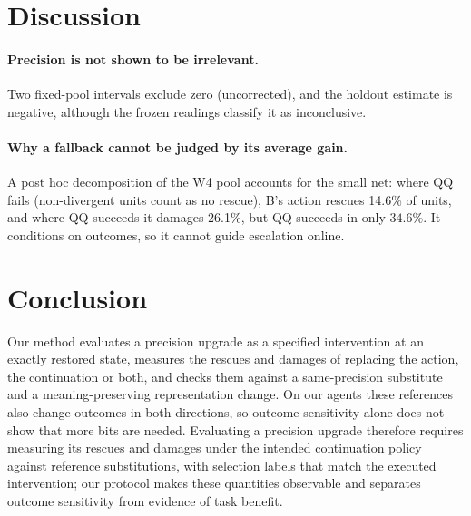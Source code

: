 \section{Discussion}
\label{sec:discussion}

\paragraph{Precision is not shown to be irrelevant.} Two fixed-pool intervals exclude zero (uncorrected), and the holdout estimate is negative, although the frozen readings classify it as inconclusive. %

\paragraph{Why a fallback cannot be judged by its average gain.} A post hoc decomposition of the \tautwo{} W4 pool accounts for the small net: where QQ fails (non-divergent units count as no rescue), B's action rescues 14.6\% of units, and where QQ succeeds it damages 26.1\%, but QQ succeeds in only $34.6\%$. It conditions on outcomes, so it cannot guide escalation online. %


\section{Conclusion}
\label{sec:conclusion}

Our method evaluates a precision upgrade as a specified intervention at an exactly restored state, measures the rescues and damages of replacing the action, the continuation or both, and checks them against a same-precision substitute and a meaning-preserving representation change. On our agents these references also change outcomes in both directions, so outcome sensitivity alone does not show that more bits are needed. Evaluating a precision upgrade therefore requires measuring its rescues and damages under the intended continuation policy against reference substitutions, with selection labels that match the executed intervention; our protocol makes these quantities observable and separates outcome sensitivity from evidence of task benefit.
